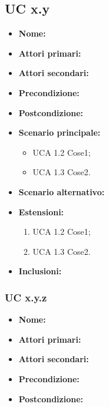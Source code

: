 \documentclass[a4paper, oneside, dvipsnames, table]{article} %
\begin{document}
\subsection{UC x.y}%
\begin{itemize}
\item \textbf{Nome:}
\item \textbf{Attori primari:}
\item \textbf{Attori secondari:}%
\item \textbf{Precondizione:}
\item \textbf{Postcondizione:}
\item \textbf{Scenario principale:}
	\begin{itemize}%
	\item UCA 1.2 Cose1;
	\item UCA 1.3 Cose2.
\end{itemize}
\item \textbf{Scenario alternativo:}
\item \textbf{Estensioni:}
	\begin{enumerate}
		\item UCA 1.2 Cose1;
		\item UCA 1.3 Cose2.
	\end{enumerate}
\item \textbf{Inclusioni:}
\end{itemize}

\subsubsection{UC x.y.z}%
\begin{itemize}
\item \textbf{Nome:}
\item \textbf{Attori primari:}
\item \textbf{Attori secondari:}%
\item \textbf{Precondizione:}
\item \textbf{Postcondizione:}
\end{itemize}
\end{document}
